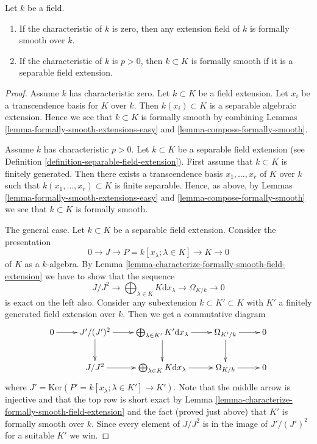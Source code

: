 \begin{lemma}
\label{lemma-fields-are-formally-smooth}
Let $k$ be a field.
\begin{enumerate}
\item If the characteristic of $k$ is zero, then any extension field
of $k$ is formally smooth over $k$.
\item If the characteristic of $k$ is $p > 0$, then $k \subset K$ is
formally smooth if it is a separable field extension.
\end{enumerate}
\end{lemma}

\begin{proof}
Assume $k$ has characteristic zero. Let $k \subset K$ be a field extension.
Let $x_i$ be a transcendence basis for $K$ over $k$.
Then $k(x_i) \subset K$ is a separable algebraic extension.
Hence we see that $k \subset K$ is formally smooth
by combining Lemmas \ref{lemma-formally-smooth-extensions-easy}
and \ref{lemma-compose-formally-smooth}.

\medskip\noindent
Assume $k$ has characteristic $p > 0$.
Let $k \subset K$ be a separable field extension (see
Definition \ref{definition-separable-field-extension}).
First assume that $k \subset K$ is finitely generated.
Then there exists a transcendence basis $x_1, \ldots, x_r$
of $K$ over $k$ such that $k(x_1, \ldots, x_r) \subset K$ is
finite separable. Hence, as above, by
Lemmas \ref{lemma-formally-smooth-extensions-easy}
and \ref{lemma-compose-formally-smooth} we see that $k \subset K$
is formally smooth.

\medskip\noindent
The general case. Let $k \subset K$ be a separable field extension.
Consider the presentation
$$
0 \longrightarrow J \longrightarrow
P = k[x_\lambda; \lambda \in K] \longrightarrow K
\longrightarrow 0
$$
of $K$ as a $k$-algebra. By
Lemma \ref{lemma-characterize-formally-smooth-field-extension}
we have to show that the sequence
$$
J/J^2 \longrightarrow
\bigoplus\nolimits_{\lambda \in K} K\text{d}x_\lambda \longrightarrow
\Omega_{K/k} \longrightarrow 0
$$
is exact on the left also. Consider any
subextension $k \subset K' \subset K$ with $K'$ a finitely
generated field extension over $k$. Then we get a commutative
diagram
$$
\xymatrix{
0 \ar[r] &
J'/(J')^2 \ar[r] \ar[d] &
\bigoplus\nolimits_{\lambda \in K'} K'\text{d}x_\lambda \ar[r] \ar[d] &
\Omega_{K'/k} \ar[r] \ar[d] & 0 \\
& J/J^2 \ar[r] &
\bigoplus\nolimits_{\lambda \in K} K\text{d}x_\lambda \ar[r] &
\Omega_{K/k} \ar[r] & 0
}
$$
where $J' = \text{Ker}(P' = k[x_\lambda; \lambda \in K'] \to K')$.
Note that the middle arrow is injective and that the top row is
short exact by Lemma \ref{lemma-characterize-formally-smooth-field-extension}
and the fact (proved just above) that $K'$ is formally smooth over $k$.
Since every element of $J/J^2$ is in the image of $J'/(J')^2$
for a suitable $K'$ we win.
\end{proof}

